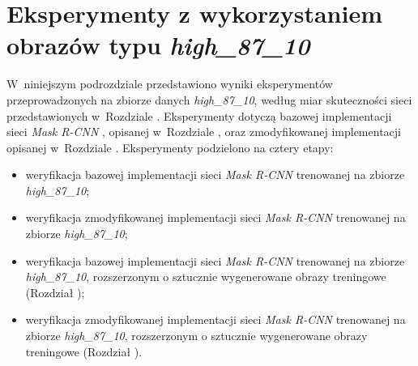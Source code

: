 \section{Eksperymenty z wykorzystaniem obrazów typu \textit{high\_87\_10}}
\label{sec:experymenty_high}
W~niniejszym podrozdziale przedstawiono wyniki eksperymentów przeprowadzonych na zbiorze danych \textit{high\_87\_10}, według miar skuteczności sieci przedstawionych w~Rozdziale .
Eksperymenty dotyczą bazowej implementacji sieci \textit{Mask R-CNN} \cite{matterport-mask-rcnn}, opisanej w~Rozdziale , oraz zmodyfikowanej implementacji opisanej w~Rozdziale .
Eksperymenty podzielono na cztery etapy:

\begin{itemize}
 \item weryfikacja bazowej implementacji sieci \textit{Mask R-CNN} trenowanej na zbiorze \textit{high\_87\_10};
 \item weryfikacja zmodyfikowanej implementacji sieci \textit{Mask R-CNN} trenowanej na zbiorze \textit{high\_87\_10};
 \item weryfikacja bazowej implementacji sieci \textit{Mask R-CNN} trenowanej na zbiorze \textit{high\_87\_10}, rozszerzonym o sztucznie wygenerowane obrazy treningowe (Rozdział );
 \item weryfikacja zmodyfikowanej implementacji sieci \textit{Mask R-CNN} trenowanej na zbiorze \textit{high\_87\_10}, rozszerzonym o sztucznie wygenerowane obrazy treningowe (Rozdział ).
\end{itemize}

